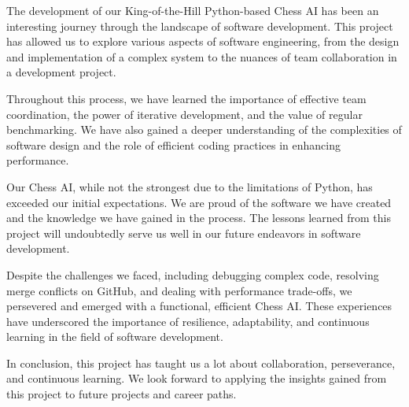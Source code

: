 The development of our King-of-the-Hill Python-based Chess AI has been an interesting journey through the landscape of software development. This project has allowed us to explore various aspects of software engineering, from the design and implementation of a complex system to the nuances of team collaboration in a development project.

Throughout this process, we have learned the importance of effective team coordination, the power of iterative development, and the value of regular benchmarking. We have also gained a deeper understanding of the complexities of software design and the role of efficient coding practices in enhancing performance.

Our Chess AI, while not the strongest due to the limitations of Python, has exceeded our initial expectations. We are proud of the software we have created and the knowledge we have gained in the process. The lessons learned from this project will undoubtedly serve us well in our future endeavors in software development.

Despite the challenges we faced, including debugging complex code, resolving merge conflicts on GitHub, and dealing with performance trade-offs, we persevered and emerged with a functional, efficient Chess AI. These experiences have underscored the importance of resilience, adaptability, and continuous learning in the field of software development.

In conclusion, this project has taught us a lot about collaboration, perseverance, and continuous learning. We look forward to applying the insights gained from this project to future projects and career paths.
